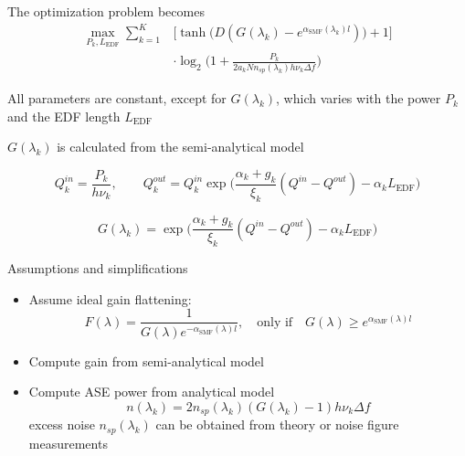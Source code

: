 \documentclass[10pt]{beamer}
\begin{document}
\begin{frame}
The optimization problem becomes
~
\begin{align} \nonumber
\max_{P_k, L_{\text{EDF}}}\sum_{k = 1}^{K} &\Big[\tanh\Big(D(G(\lambda_k) - e^{\alpha_{\text{SMF}}(\lambda_k)l})\Big) + 1\Big] \\ \nonumber
&\cdot\log_2\Bigg(1 + \frac{P_k}{2a_kNn_{sp}(\lambda_k)h\nu_k\Delta f}\Bigg)
\end{align}

All parameters are constant, except for $G(\lambda_k)$, which varies with the power $P_k$ and the EDF length $L_{\text{EDF}}$

$G(\lambda_k)$ is calculated from the semi-analytical model

\begin{equation} \nonumber
Q^{in}_k = \frac{P_k}{h\nu_k}, \qquad Q^{out}_k = Q^{in}_k\exp\Big(\frac{\alpha_k + g_k}{\xi_k}(Q^{in} - Q^{out}) - \alpha_kL_{\text{EDF}}\Big)
\end{equation}

\begin{equation} \nonumber
G(\lambda_k) = \exp\Big(\frac{\alpha_k + g_k}{\xi_k}(Q^{in} - Q^{out}) - \alpha_kL_{\text{EDF}}\Big)
\end{equation}

\end{frame}

\begin{frame}
\begin{center}
	\resizebox{\textwidth}{!}{}
\end{center}

Assumptions and simplifications
\begin{itemize}
	\item Assume ideal gain flattening: 
	\begin{equation*}
		\displaystyle F(\lambda) = \displaystyle\frac{1}{G(\lambda)e^{-\alpha_{\text{SMF}}(\lambda)l}}, \quad \text{only if} \quad G(\lambda) \geq e^{\alpha_{\text{SMF}}(\lambda)l}
	\end{equation*}
	\item Compute gain from semi-analytical model
	\item Compute ASE power from analytical model 
	\begin{equation*}
	n(\lambda_k) = 2n_{sp}(\lambda_k)(G(\lambda_k)-1)h\nu_k\Delta f
	\end{equation*}
	excess noise $n_{sp}(\lambda_k)$ can be obtained from theory or noise figure measurements
\end{itemize}

\end{frame}
\end{document}
